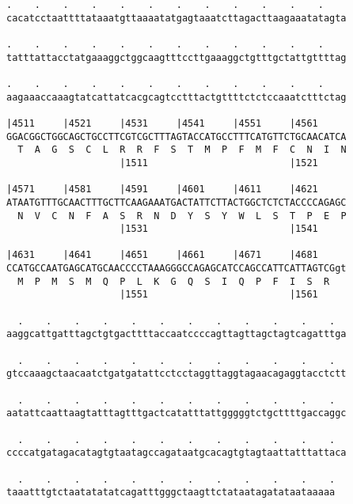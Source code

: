 \documentclass{article}
\begin{document}
\begin{Verbatim}
.    .    .    .    .    .    .    .    .    .    .    .    
cacatcctaattttataaatgttaaaatatgagtaaatcttagacttaagaaatatagta
                                                            
.    .    .    .    .    .    .    .    .    .    .    .    
tatttattacctatgaaaggctggcaagtttccttgaaaggctgtttgctattgttttag
                                                            
.    .    .    .    .    .    .    .    .    .    .    .    
aagaaaccaaagtatcattatcacgcagtcctttactgttttctctccaaatctttctag
                                                            
|4511     |4521     |4531     |4541     |4551     |4561     
GGACGGCTGGCAGCTGCCTTCGTCGCTTTAGTACCATGCCTTTCATGTTCTGCAACATCA
  T  A  G  S  C  L  R  R  F  S  T  M  P  F  M  F  C  N  I  N
                    |1511                         |1521     
  
|4571     |4581     |4591     |4601     |4611     |4621     
ATAATGTTTGCAACTTTGCTTCAAGAAATGACTATTCTTACTGGCTCTCTACCCCAGAGC
  N  V  C  N  F  A  S  R  N  D  Y  S  Y  W  L  S  T  P  E  P
                    |1531                         |1541     
  
|4631     |4641     |4651     |4661     |4671     |4681     
CCATGCCAATGAGCATGCAACCCCTAAAGGGCCAGAGCATCCAGCCATTCATTAGTCGgt
  M  P  M  S  M  Q  P  L  K  G  Q  S  I  Q  P  F  I  S  R   
                    |1551                         |1561     
  
  .    .    .    .    .    .    .    .    .    .    .    .  
aaggcattgatttagctgtgacttttaccaatccccagttagttagctagtcagatttga
                                                            
  .    .    .    .    .    .    .    .    .    .    .    .  
gtccaaagctaacaatctgatgatattcctcctaggttaggtagaacagaggtacctctt
                                                            
  .    .    .    .    .    .    .    .    .    .    .    .  
aatattcaattaagtatttagtttgactcatatttattgggggtctgcttttgaccaggc
                                                            
  .    .    .    .    .    .    .    .    .    .    .    .  
ccccatgatagacatagtgtaatagccagataatgcacagtgtagtaattatttattaca
                                                            
  .    .    .    .    .    .    .    .    .    .    .    .
taaatttgtctaatatatatcagatttgggctaagttctataatagatataataaaaa
                                                          

\end{Verbatim}
\end{document}

